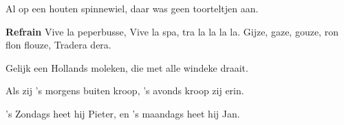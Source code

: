 \footnotemark [
ititle={Daar was e wuf da spon}]


\beginverse
{}
Al op een houten spinnewiel, daar was geen toorteltjen aan.
\endverse

\beginchorus
\textbf{Refrain}
Vive la peperbusse,
Vive la spa, tra la la la la.
Gijze, gaze, gouze, ron flon flouze,
Tradera dera.
\endchorus

\beginverse
{}
Gelijk een Hollands moleken, die met alle windeke draait.
\endverse

\beginverse
{}
Als zij 's morgens buiten kroop, 's avonds kroop zij erin.
\endverse

\beginverse
{}
's Zondags heet hij Pieter, en 's maandags heet hij Jan.
\endverse
\endsong